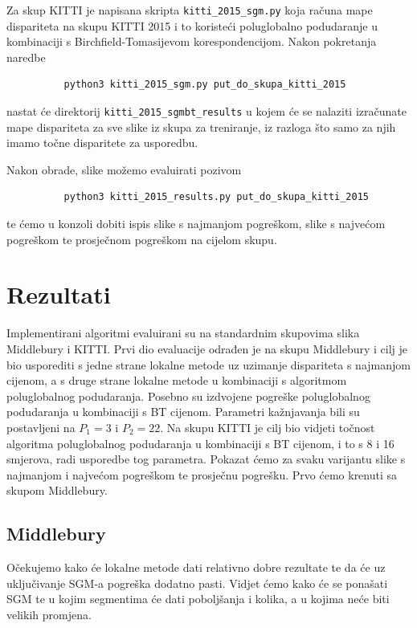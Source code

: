 \documentclass[utf8, zavrsni, numeric]{fer}
\begin{document}
Za skup KITTI je napisana skripta {\verb|kitti_2015_sgm.py|} koja računa mape dispariteta
na skupu KITTI 2015 i to koristeći poluglobalno podudaranje u kombinaciji s Birchfield-Tomasijevom korespondencijom. Nakon pokretanja naredbe
\begin{verbatim}
          python3 kitti_2015_sgm.py put_do_skupa_kitti_2015
\end{verbatim}
nastat će direktorij {\verb|kitti_2015_sgmbt_results|} u kojem će se nalaziti izračunate
mape dispariteta za sve slike iz skupa za treniranje, iz razloga što samo za njih imamo točne
disparitete za usporedbu.

Nakon obrade, slike možemo evaluirati pozivom
\begin{verbatim}
          python3 kitti_2015_results.py put_do_skupa_kitti_2015
\end{verbatim}
te ćemo u konzoli dobiti ispis slike s najmanjom pogreškom, slike s najvećom pogreškom te
prosječnom pogreškom na cijelom skupu.



\chapter{Rezultati}

Implementirani algoritmi evaluirani su na standardnim skupovima slika Middlebury i KITTI.
Prvi dio evaluacije odrađen je na skupu Middlebury i cilj je bio usporediti s jedne strane lokalne metode
uz uzimanje dispariteta s najmanjom cijenom, a s druge strane lokalne metode u kombinaciji s
algoritmom poluglobalnog podudaranja. Posebno su izdvojene pogreške poluglobalnog podudaranja
u kombinaciji s BT cijenom. Parametri kažnjavanja bili su postavljeni na $P_1 = 3$ i $P_2 = 22$.
Na skupu KITTI je cilj bio vidjeti točnost algoritma poluglobalnog podudaranja u kombinaciji
s BT cijenom, i to s 8 i 16 smjerova, radi usporedbe tog parametra. Pokazat ćemo za svaku
varijantu slike s najmanjom i najvećom pogreškom te prosječnu pogrešku. Prvo ćemo krenuti sa skupom Middlebury.

\section{Middlebury}

Očekujemo kako će lokalne metode dati relativno dobre rezultate te da će uz uključivanje
SGM-a pogreška dodatno pasti. Vidjet ćemo kako će se ponašati SGM te u kojim segmentima će
dati poboljšanja i kolika, a u kojima neće biti velikih promjena.
\end{document}
